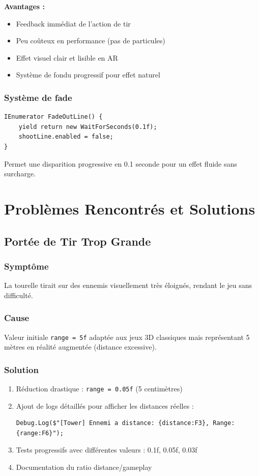 \documentclass[12pt,a4paper]{article}
\begin{document}
\textbf{Avantages :}
\begin{itemize}
    \item Feedback immédiat de l'action de tir
    \item Peu coûteux en performance (pas de particules)
    \item Effet visuel clair et lisible en AR
    \item Système de fondu progressif pour effet naturel
\end{itemize}

\subsubsection{Système de fade}

\begin{lstlisting}[caption=Coroutine de fondu]
IEnumerator FadeOutLine() {
    yield return new WaitForSeconds(0.1f);
    shootLine.enabled = false;
}
\end{lstlisting}

Permet une disparition progressive en 0.1 seconde pour un effet fluide sans surcharge.

\section{Problèmes Rencontrés et Solutions}

\subsection{Portée de Tir Trop Grande}

\subsubsection{Symptôme}
La tourelle tirait sur des ennemis visuellement très éloignés, rendant le jeu sans difficulté.

\subsubsection{Cause}
Valeur initiale \texttt{range = 5f} adaptée aux jeux 3D classiques mais représentant 5 mètres en réalité augmentée (distance excessive).

\subsubsection{Solution}
\begin{enumerate}
    \item Réduction drastique : \texttt{range = 0.05f} (5 centimètres)
    \item Ajout de logs détaillés pour afficher les distances réelles :
\begin{lstlisting}
Debug.Log($"[Tower] Ennemi a distance: {distance:F3}, Range: {range:F6}");
\end{lstlisting}
    \item Tests progressifs avec différentes valeurs : 0.1f, 0.05f, 0.03f
    \item Documentation du ratio distance/gameplay
\end{enumerate}
\end{document}
